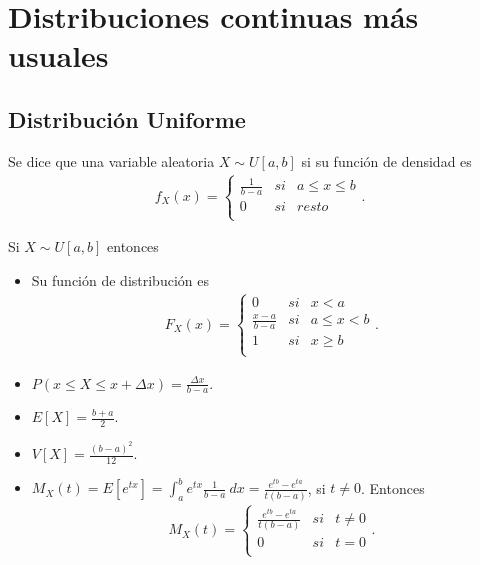 \chapter{Distribuciones continuas más usuales}

\section{Distribución Uniforme}

\begin{defi}
    Se dice que una variable aleatoria $X \sim U[a,b]$ si su función de densidad es
    \begin{align*}
        f_X(x) = \left\{ \begin{array}{lcc}
                             \frac{1}{b - a} & si & a \leq x \leq b \\
                             0               & si & resto           \\
                         \end{array}
        \right. .
    \end{align*}
\end{defi}

\begin{obs}
    Si $X \sim U[a,b]$ entonces
    \begin{itemize}
        \item Su función de distribución es
              \begin{align*}
                  F_X(x) = \left\{ \begin{array}{lcc}
                                       0                   & si & x < a        \\
                                       \frac{x - a}{b - a} & si & a \leq x < b \\
                                       1                   & si & x \ge b      \\
                                   \end{array}
                  \right. .
              \end{align*}
        \item $P(x \leq X \leq x + \Delta x) = \frac{\Delta x}{b - a}$.
        \item $E[X] = \frac{b + a}{2}$.
        \item $V[X] = \frac{(b -a)^2}{12}$.
        \item $M_X(t) = E[e^{tx}] = \int_{a}^{b}{e^{tx}\frac{1}{b -a } \ dx} = \frac{e^{tb} - e^{ta}}{t(b -a )}$, si $t \not = 0$. Entonces
              \begin{align*}
                  M_X(t) = \left\{ \begin{array}{lcc}
                                       \frac{e^{tb} - e^{ta}}{t(b -a )} & si & t \not = 0 \\
                                       0                                & si & t = 0      \\
                                   \end{array}
                  \right. .
              \end{align*}
    \end{itemize}
\end{obs}

